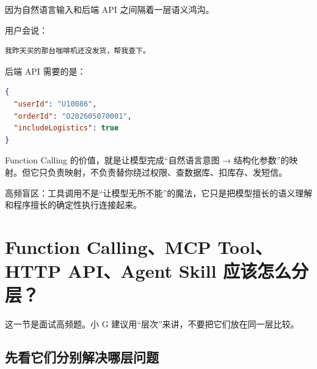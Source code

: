 \documentclass[10pt,a4paper]{ctexart}
\begin{document}
因为自然语言输入和后端 API 之间隔着一层语义鸿沟。



用户会说：



\begin{lstlisting}
我昨天买的那台咖啡机还没发货，帮我查下。
\end{lstlisting}



后端 API 需要的是：



\begin{lstlisting}[language=json]
{
  "userId": "U10086",
  "orderId": "O202605070001",
  "includeLogistics": true
}
\end{lstlisting}



Function Calling 的价值，就是让模型完成“自然语言意图 → 结构化参数”的映射。但它只负责映射，不负责替你绕过权限、查数据库、扣库存、发短信。



高频盲区：工具调用不是“让模型无所不能”的魔法，它只是把模型擅长的语义理解和程序擅长的确定性执行连接起来。



\section{Function Calling、MCP Tool、HTTP API、Agent Skill 应该怎么分层？}


这一节是面试高频题。小 G 建议用“层次”来讲，不要把它们放在同一层比较。



\subsection{先看它们分别解决哪层问题}
\end{document}
